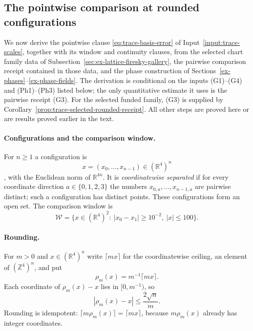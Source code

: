 \subsection{The pointwise comparison at rounded configurations}
\label{subsec:trace-rounded-comparison}

We now derive the pointwise clause \eqref{eq:trace-basis-error} of
Input~\ref{input:trace-scales}, together with its window and continuity
clauses, from the selected chart family data of
Subsection~\ref{sec:ex-lattice-firesky-gallery}, the pairwise comparison
receipt contained in those data, and the phase construction of
Sections~\ref{ex-phases}--\ref{ex-phase-fields}. The derivation is
conditional on the inputs (G1)--(G4) and (Ph1)--(Ph3) listed below; the
only quantitative estimate it uses is the pairwise receipt (G3). For the selected funded family, (G3) is supplied by
Corollary~\ref{prop:trace-selected-rounded-receipt}. All other
steps are proved here or are results proved earlier in the text.

\paragraph{Configurations and the comparison window.}
For $n\ge1$ a configuration is \[
x=(x_0,\ldots,x_{n-1})\in(\mathbb R^4)^n
\], with the Euclidean norm of $\mathbb R^{4n}$. It is
\emph{coordinatewise separated} if for every coordinate direction
$a\in\{0,1,2,3\}$ the numbers $x_{0,a},\ldots,x_{n-1,a}$ are pairwise
distinct; such a configuration has distinct points. These configurations
form an open set. The comparison window is
\[
 \mathcal W=\{x\in(\mathbb R^4)^2:\ |x_0-x_1|\ge10^{-2},\ |x|\le100\}.
\]

\paragraph{Rounding.}
For $m>0$ and $x\in(\mathbb R^4)^n$ write $\lceil mx\rceil$ for the
coordinatewise ceiling, an element of $(\mathbb Z^4)^n$, and put
\[
 \rho_m(x)=m^{-1}\lceil mx\rceil .
\]
Each coordinate of $\rho_m(x)-x$ lies in $[0,m^{-1})$, so
\begin{equation}\label{eq:trace-rounding-error}
 |\rho_m(x)-x|\le \frac{2\sqrt n}{m}.
\end{equation}
Rounding is idempotent: $\lceil m\rho_m(x)\rceil=\lceil mx\rceil$,
because $m\rho_m(x)$ already has integer coordinates.

